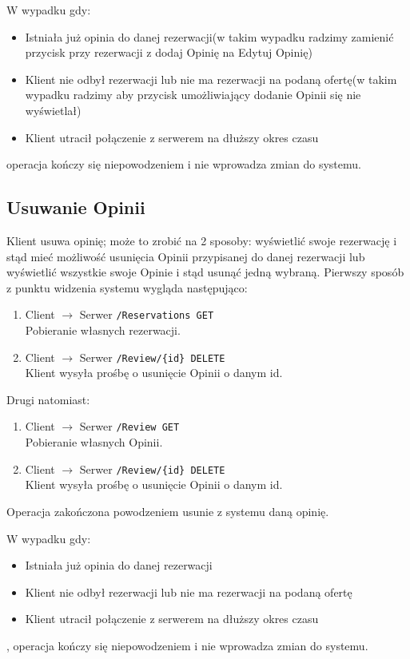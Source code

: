 \documentclass{article}
\begin{document}
W wypadku gdy:
\begin{itemize}
    \item Istniała już opinia do danej rezerwacji(w takim wypadku radzimy zamienić przycisk przy rezerwacji z dodaj Opinię na Edytuj Opinię)
    \item Klient nie odbył rezerwacji lub nie ma rezerwacji na podaną ofertę(w takim wypadku radzimy aby przycisk umożliwiający dodanie Opinii się nie wyświetlał)
    \item Klient utracił połączenie z serwerem na dłuższy okres czasu 
\end{itemize}
operacja kończy się niepowodzeniem i nie wprowadza zmian do systemu.

\subsection{Usuwanie Opinii}
Klient usuwa opinię; może to zrobić na 2 sposoby: wyświetlić swoje rezerwację i stąd mieć możliwość usunięcia Opinii przypisanej do danej rezerwacji lub wyświetlić wszystkie swoje Opinie i stąd usunąć jedną wybraną.
Pierwszy sposób z punktu widzenia systemu wygląda następująco:
\begin{enumerate}
    \item Client $\rightarrow$  Serwer \texttt{/Reservations GET} \\
    Pobieranie własnych rezerwacji.
    \item Client $\rightarrow$ Serwer \texttt{/Review/\{id\} DELETE}\\
    Klient wysyła prośbę o usunięcie Opinii o danym id.
\end{enumerate}
Drugi natomiast:
\begin{enumerate}
    \item Client $\rightarrow$  Serwer \texttt{/Review GET} \\
    Pobieranie własnych Opinii.
    \item Client $\rightarrow$ Serwer \texttt{/Review/\{id\} DELETE}\\
    Klient wysyła prośbę o usunięcie Opinii o danym id.
\end{enumerate}
Operacja zakończona powodzeniem usunie z systemu daną opinię.

W wypadku gdy:
\begin{itemize}
    \item Istniała już opinia do danej rezerwacji
    \item Klient nie odbył rezerwacji lub nie ma rezerwacji na podaną ofertę
    \item Klient utracił połączenie z serwerem na dłuższy okres czasu 
\end{itemize}
, operacja kończy się niepowodzeniem i nie wprowadza zmian do systemu.
\end{document}
